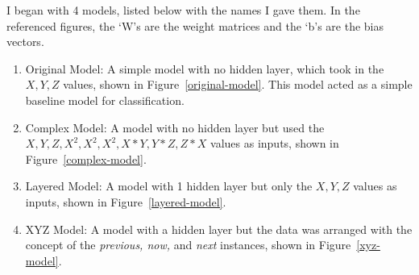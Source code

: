 \documentclass[]{report}
\begin{document}
I began with 4 models, listed below with the names I gave them. In the referenced figures, the `W's are the weight matrices and the `b's are the bias vectors.
\begin{enumerate}
	\item Original Model: A simple model with no hidden layer, which took in the $X,Y,Z$ values, shown in Figure~\ref{original-model}. This model acted as a simple baseline model for classification.
	\item Complex Model: A model with no hidden layer but used the $X,Y,Z,X^{2},X^{2},X^{2},X*Y,Y*Z,Z*X$ values as inputs, shown in Figure~\ref{complex-model}.
	\item Layered Model: A model with 1 hidden layer but only the $X,Y,Z$ values as inputs, shown in Figure~\ref{layered-model}.
	\item XYZ Model: A model with a hidden layer but the data was arranged with the concept of the \textit{previous, now,} and \textit{next} instances, shown in Figure~\ref{xyz-model}.
\end{enumerate}
\end{document}
